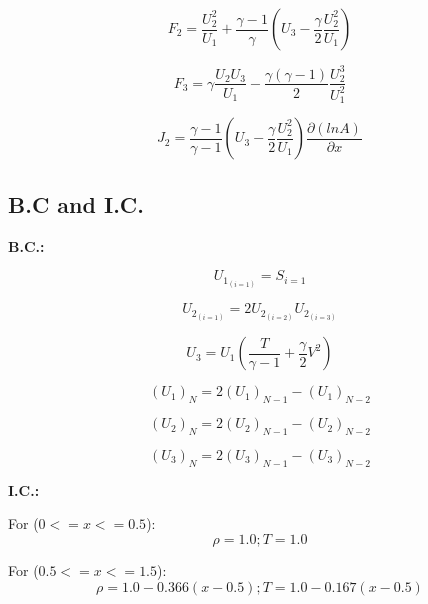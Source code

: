 \begin{equation}
F_2 = \frac{U^2_2}{U_1}+\frac{\gamma -1}{\gamma}( U_3-\frac{\gamma}{2} \frac{U_2^2}{U_1} )
\end{equation}

\begin{equation}
F_3 = \gamma \frac{U_2 U_3}{U_1} - \frac{\gamma(\gamma -1)}{2}\frac{U_2^3}{U_1^2}
\end{equation}

\begin{equation}
J_2 = \frac{\gamma -1}{\gamma -1}(U_3-\frac{\gamma}{2}\frac{U_2^2}{U_1}) \frac{\partial (ln A)}{\partial x}
\end{equation}

\subsection{B.C and I.C.}

\textbf{B.C.:}

\begin{equation}
U_{1_{(i=1)}} = S_{i=1}
\end{equation}

\begin{equation}
U_{2_{(i=1)}} = 2 U_{2_{(i=2)}} U_{2_{(i=3)}}
\end{equation}

\begin{equation}
U_3 = U_1( \frac{T}{\gamma -1}+\frac{\gamma}{2}V^2 )
\end{equation}

\begin{equation}
(U_1)_N = 2 (U_1)_{N-1} - (U_1)_{N-2}
\end{equation}

\begin{equation}
(U_2)_N = 2 (U_2)_{N-1} - (U_2)_{N-2}
\end{equation}

\begin{equation}
(U_3)_N = 2 (U_3)_{N-1} - (U_3)_{N-2}
\end{equation}

\textbf{I.C.:}

For ($0<=x<=0.5$):
\begin{equation}
\rho = 1.0; T =1.0
\end{equation}

For ($0.5<=x<=1.5$):
\begin{equation}
\rho = 1.0-0.366(x-0.5); T =1.0-0.167(x-0.5)
\end{equation}

